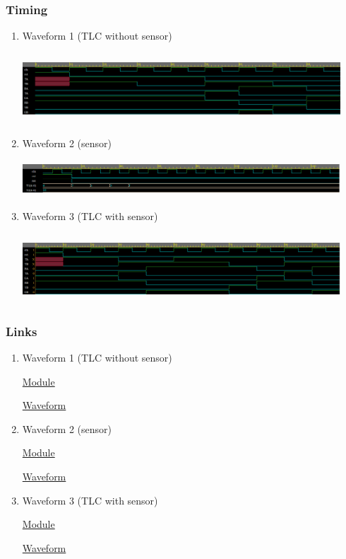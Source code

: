 \documentclass[11pt]{article}
\begin{document}
\subsubsection{Timing}
\label{sec:org2889174}
\begin{enumerate}
\item Waveform 1 (TLC without sensor)
\label{sec:org655fadd}
\begin{center}
\includegraphics[width=450px,height=100px]{./assets/TLC_waveform1.png}
\end{center}
\item Waveform 2 (sensor)
\label{sec:org09b4968}
\begin{center}
\includegraphics[width=450px,height=50px]{./assets/TLC_waveform2.png}
\end{center}
\item Waveform 3 (TLC with sensor)
\label{sec:orgb84be6c}
\begin{center}
\includegraphics[width=450px,height=100px]{./assets/TLC_waveform3.png}
\end{center}
\end{enumerate}
\subsubsection{Links}
\label{sec:org1a3cbce}
\begin{enumerate}
\item Waveform 1 (TLC without sensor)
\label{sec:org7572e36}

\href{https://www.edaplayground.com/x/3qgC}{Module}

\href{https://www.edaplayground.com/w/x/2yK}{Waveform}
\item Waveform 2 (sensor)
\label{sec:org80b007a}

\href{https://www.edaplayground.com/x/4vEy}{Module}

\href{https://www.edaplayground.com/w/x/3Gs}{Waveform}
\item Waveform 3 (TLC with sensor)
\label{sec:org17fefce}

\href{https://www.edaplayground.com/x/ie6}{Module}

\href{https://www.edaplayground.com/w/x/3aQ}{Waveform}
\end{enumerate}
\end{document}
